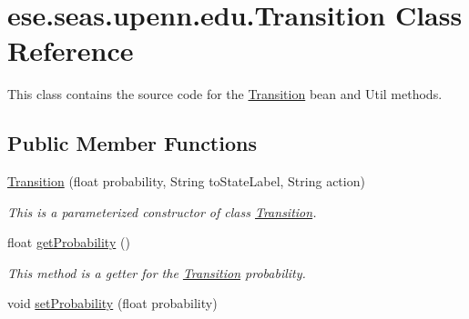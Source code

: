 \hypertarget{classese_1_1seas_1_1upenn_1_1edu_1_1_transition}{}\section{ese.\+seas.\+upenn.\+edu.\+Transition Class Reference}
\label{classese_1_1seas_1_1upenn_1_1edu_1_1_transition}


This class contains the source code for the \hyperlink{classese_1_1seas_1_1upenn_1_1edu_1_1_transition}{Transition} bean and Util methods.  


\subsection*{Public Member Functions}
\begin{DoxyCompactItemize}
\item 
\hypertarget{classese_1_1seas_1_1upenn_1_1edu_1_1_transition_ae400900946cce4a3eed16807cc4c4aac}{}\hyperlink{classese_1_1seas_1_1upenn_1_1edu_1_1_transition_ae400900946cce4a3eed16807cc4c4aac}{Transition} (float probability, String to\+State\+Label, String action)\label{classese_1_1seas_1_1upenn_1_1edu_1_1_transition_ae400900946cce4a3eed16807cc4c4aac}

\begin{DoxyCompactList}\small\item\em This is a parameterized constructor of class \hyperlink{classese_1_1seas_1_1upenn_1_1edu_1_1_transition}{Transition}. \end{DoxyCompactList}\item 
\hypertarget{classese_1_1seas_1_1upenn_1_1edu_1_1_transition_a76913b9db35b0d64278d511489ce2361}{}float \hyperlink{classese_1_1seas_1_1upenn_1_1edu_1_1_transition_a76913b9db35b0d64278d511489ce2361}{get\+Probability} ()\label{classese_1_1seas_1_1upenn_1_1edu_1_1_transition_a76913b9db35b0d64278d511489ce2361}

\begin{DoxyCompactList}\small\item\em This method is a getter for the \hyperlink{classese_1_1seas_1_1upenn_1_1edu_1_1_transition}{Transition} probability. \end{DoxyCompactList}\item 
\hypertarget{classese_1_1seas_1_1upenn_1_1edu_1_1_transition_aad1a0ce12182468aceac85ea0262e0ba}{}void \hyperlink{classese_1_1seas_1_1upenn_1_1edu_1_1_transition_aad1a0ce12182468aceac85ea0262e0ba}{set\+Probability} (float probability)\label{classese_1_1seas_1_1upenn_1_1edu_1_1_transition_aad1a0ce12182468aceac85ea0262e0ba}


\end{DoxyCompactItemize}

